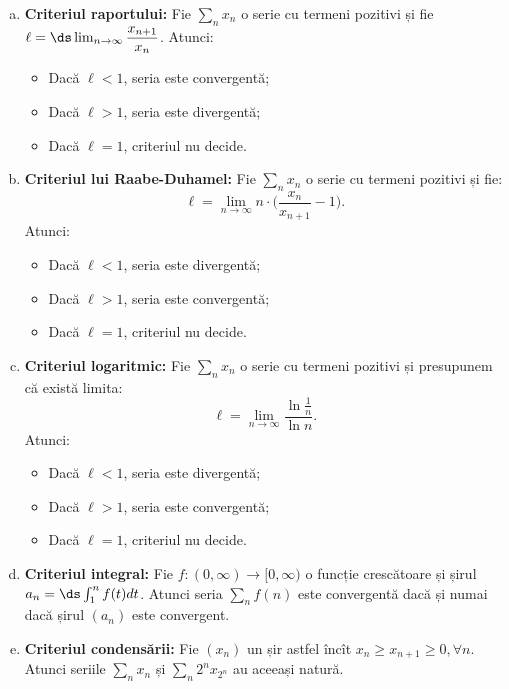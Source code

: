 \begin{enumerate}[(a)]
\begin{itemize}
  \item Dacă $ \ell > 1 $, seria este divergentă;
  \item Dacă $ \ell = 1 $, criteriul nu decide.
  \end{itemize}
\item \textbf{Criteriul raportului:} Fie $ \sum_n x_n $ o serie cu termeni
  pozitivi și fie $ \ell = \ds\lim_{n \to \infty} \dfrac{x_{n+1}}{x_n} $.
  Atunci:
  \begin{itemize}
  \item Dacă $ \ell < 1 $, seria este convergentă;
  \item Dacă $ \ell > 1 $, seria este divergentă;
  \item Dacă $ \ell = 1 $, criteriul nu decide.
  \end{itemize}
\item \textbf{Criteriul lui Raabe-Duhamel:} Fie $ \sum_n x_n $ o serie
  cu termeni pozitivi și fie:
  \[
    \ell = \lim_{n \to \infty} n \cdot \Big( \frac{x_n}{x_{n+1}} - 1 \Big).
  \]
  Atunci:
  \begin{itemize}
  \item Dacă $ \ell < 1 $, seria este divergentă;
  \item Dacă $ \ell > 1 $, seria este convergentă;
  \item Dacă $ \ell = 1 $, criteriul nu decide.
  \end{itemize}
\item \textbf{Criteriul logaritmic:} Fie $ \sum_n x_n $ o serie cu termeni
  pozitivi și presupunem că există limita:
  \[
    \ell = \lim_{n \to \infty} \frac{\ln \frac{1}{n}}{\ln n}.
  \]
  Atunci:
  \begin{itemize}
  \item Dacă $ \ell < 1 $, seria este divergentă;
  \item Dacă $ \ell > 1 $, seria este convergentă;
  \item Dacă $ \ell = 1 $, criteriul nu decide.
  \end{itemize}
\item \textbf{Criteriul integral:} Fie $ f: (0, \infty) \to [0, \infty) $ o
  funcție crescătoare și șirul $ a_n = \ds\int_1^n f(t) dt $. Atunci seria
  $ \sum_n f(n) $ este convergentă dacă și numai dacă șirul $ (a_n) $ este
  convergent.
\item \textbf{Criteriul condensării:} Fie $ (x_n) $ un șir astfel încît
  $ x_n \geq x_{n+1} \geq 0, \forall n $.
  Atunci seriile $ \sum_n x_n $ și $ \sum_n 2^n x_{2^n} $ au aceeași natură.
\end{enumerate}

